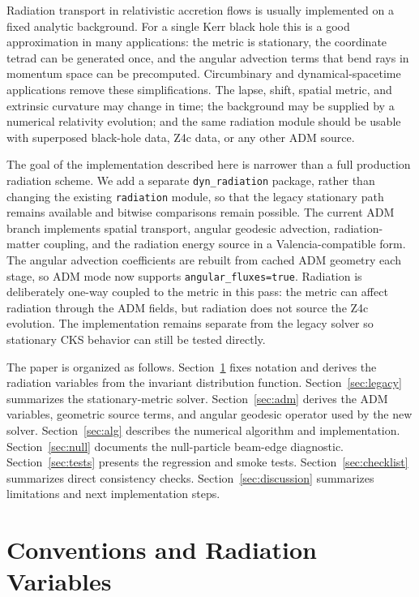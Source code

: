 \documentclass[11pt]{article}
\newcommand{\code}[1]{\texttt{#1}}
\begin{document}
Radiation transport in relativistic accretion flows is usually implemented on a
fixed analytic background.  For a single Kerr black hole this is a good
approximation in many applications: the metric is stationary, the coordinate
tetrad can be generated once, and the angular advection terms that bend rays in
momentum space can be precomputed.  Circumbinary and dynamical-spacetime
applications remove these simplifications.  The lapse, shift, spatial metric,
and extrinsic curvature may change in time; the background may be supplied by a
numerical relativity evolution; and the same radiation module should be usable
with superposed black-hole data, Z4c data, or any other ADM source.

The goal of the implementation described here is narrower than a full
production radiation scheme.  We add a separate \code{dyn\_radiation} package,
rather than changing the existing \code{radiation} module, so that the legacy
stationary path remains available and bitwise comparisons remain possible.  The
current ADM branch implements spatial transport, angular geodesic advection,
radiation-matter coupling, and the radiation energy source in a
Valencia-compatible form.  The angular advection coefficients are rebuilt from
cached ADM geometry each stage, so ADM mode now supports
\code{angular\_fluxes=true}.  Radiation is deliberately one-way coupled to the
metric in this pass: the metric can affect radiation through the ADM fields,
but radiation does not source the Z4c evolution.  The implementation remains
separate from the legacy solver so stationary CKS behavior can still be tested
directly.

The paper is organized as follows.  Section~\ref{sec:notation} fixes notation
and derives the radiation variables from the invariant distribution function.
Section~\ref{sec:legacy} summarizes the stationary-metric solver.
Section~\ref{sec:adm} derives the ADM variables, geometric source terms, and
angular geodesic operator used by the new solver.  Section~\ref{sec:alg}
describes the numerical algorithm and implementation.  Section~\ref{sec:null}
documents the null-particle beam-edge diagnostic.  Section~\ref{sec:tests}
presents the regression and smoke tests.  Section~\ref{sec:checklist}
summarizes direct consistency checks.  Section~\ref{sec:discussion} summarizes
limitations and next implementation steps.

\section{Conventions and Radiation Variables}
\label{sec:notation}
\end{document}
